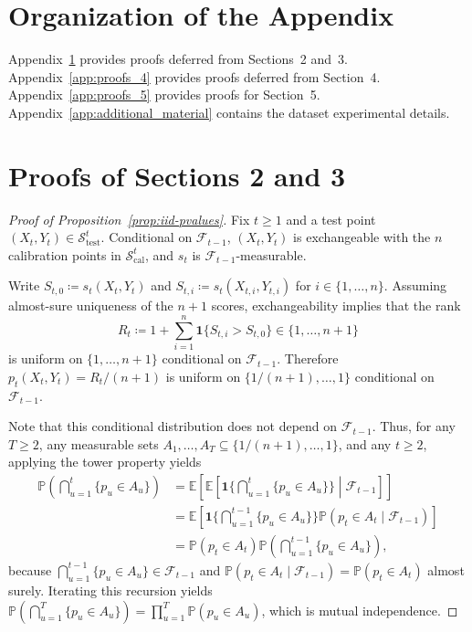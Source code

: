 \documentclass{uai2026} %
\newcommand{\1}{\mathbf{1}}
\newcommand{\ind}[1]{\mathbf{1}\{#1\}}
\newcommand{\prob}{\mathbb{P}}
\newcommand{\expec}{\mathbb{E}}
\newcommand{\test}{\mathrm{test}}
\newcommand{\scal}{\mathcal{S}}
\newcommand{\F}{\mathcal{F}}
\newcommand{\cali}{\mathrm{cal}}
\newcommand{\scalcal}{\scal_{\cali}}
\newcommand{\scaltest}{\scal_{\test}}
\begin{document}

\appendix
\onecolumn

\section*{Organization of the Appendix}

Appendix~\ref{app:proofs_2_3} provides proofs deferred from Sections~2 and~3. Appendix~\ref{app:proofs_4} provides proofs deferred from Section~4. Appendix~\ref{app:proofs_5} provides proofs for Section~5. Appendix~\ref{app:additional_material} contains the dataset experimental details.

\section{Proofs of Sections 2 and 3}
\label{app:proofs_2_3}

\begin{proof}[Proof of Proposition~\ref{prop:iid-pvalues}]
  Fix $t\ge 1$ and a test point $(X_t,Y_t)\in\scaltest^t$.
  Conditional on $\F_{t-1}$, $(X_t,Y_t)$ is exchangeable with the $n$ calibration points in $\scalcal^t$, and $s_t$ is $\F_{t-1}$-measurable.

  Write $S_{t,0}\coloneqq s_t(X_t,Y_t)$ and $S_{t,i}\coloneqq s_t(X_{t,i},Y_{t,i})$ for $i\in\{1,\dots,n\}$.
  Assuming almost-sure uniqueness of the $n+1$ scores, exchangeability implies that the rank
  \begin{equation*}
    R_t
    \coloneqq
    1+\sum_{i=1}^{n}\ind{S_{t,i}>S_{t,0}}
    \in\{1,\dots,n+1\}
  \end{equation*}
  is uniform on $\{1,\dots,n+1\}$ conditional on $\F_{t-1}$.
  Therefore $p_t(X_t,Y_t)=R_t/(n+1)$ is uniform on $\{1/(n+1),\dots,1\}$ conditional on $\F_{t-1}$.

  Note that this conditional distribution does not depend on $\F_{t-1}$. Thus, for any $T\ge 2$, any measurable sets $A_1,\dots,A_T\subseteq\{1/(n+1),\dots,1\}$, and any $t\ge 2$, applying the tower property yields
  \begin{equation*}
    \begin{aligned}
      \prob\left(\bigcap_{u=1}^{t}\{p_u\in A_u\}\right)
      &= \expec\left[ \expec\left[ \ind{\bigcap_{u=1}^{t}\{p_u\in A_u\}} \middle| \F_{t-1} \right] \right] \\
      &= \expec\left[\ind{\bigcap_{u=1}^{t-1}\{p_u\in A_u\}}\prob(p_t\in A_t\mid \F_{t-1})\right] \\
      &= \prob(p_t\in A_t)\prob\left(\bigcap_{u=1}^{t-1}\{p_u\in A_u\}\right),
    \end{aligned}
  \end{equation*}
  because $\bigcap_{u=1}^{t-1}\{p_u\in A_u\}\in\F_{t-1}$ and $\prob(p_t\in A_t\mid \F_{t-1})=\prob(p_t\in A_t)$ almost surely.
  Iterating this recursion yields $\prob(\bigcap_{u=1}^{T}\{p_u\in A_u\})=\prod_{u=1}^{T}\prob(p_u\in A_u)$, which is mutual independence.
\end{proof}
\end{document}
